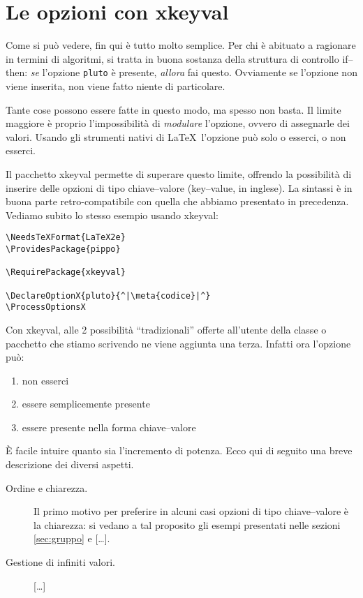 \documentclass{scrartcl}
\newcommand{\meta}[1]{$\langle$\textit{#1}$\rangle$}
\begin{document}
\section{Le opzioni con xkeyval}
Come si può vedere, fin qui è tutto molto semplice. Per chi è abituato a ragionare in termini di algoritmi, si tratta in buona sostanza della struttura di controllo if--then: \emph{se} l'opzione \lstinline+pluto+ è presente, \emph{allora} fai questo. Ovviamente se l'opzione non viene inserita, non viene fatto niente di particolare.

Tante cose possono essere fatte in questo modo, ma spesso non basta. Il limite maggiore è proprio l'impossibilità di \emph{modulare} l'opzione, ovvero di assegnarle dei valori.  Usando gli strumenti nativi di \LaTeX\ l'opzione può solo o esserci, o non esserci.

Il pacchetto xkeyval permette di superare questo limite, offrendo la possibilità di inserire delle opzioni di tipo chiave--valore (key--value, in inglese). La sintassi è in buona parte retro-compatibile con quella che abbiamo presentato in precedenza. Vediamo subito lo stesso esempio usando xkeyval:
\begin{lstlisting}
\NeedsTeXFormat{LaTeX2e}
\ProvidesPackage{pippo}

\RequirePackage{xkeyval}

\DeclareOptionX{pluto}{^|\meta{codice}|^}
\ProcessOptionsX
\end{lstlisting}

Con xkeyval, alle 2 possibilità ``tradizionali'' offerte all'utente della classe o pacchetto che stiamo scrivendo ne viene aggiunta una terza. Infatti ora l'opzione può:
\begin{enumerate}
\item non esserci
\item essere semplicemente presente
\item essere presente nella forma chiave--valore
\end{enumerate}

È facile intuire quanto sia l'incremento di potenza. Ecco qui di seguito una breve descrizione dei diversi aspetti.
\begin{description}
\item[Ordine e chiarezza.] Il primo motivo per preferire in alcuni casi opzioni di tipo chiave--valore è la chiarezza: si vedano a tal proposito gli esempi presentati nelle sezioni \ref{sec:gruppo} e [\dots].
\item[Gestione di infiniti valori.] [\dots]
\end{description}
\end{document}
